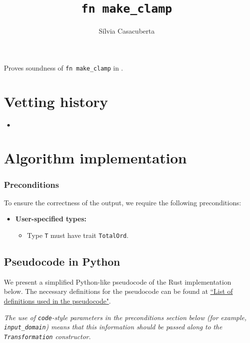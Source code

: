 \documentclass{article}
\title{\texttt{fn make\_clamp}}
\author{S\'ilvia Casacuberta}
\date{}
\begin{document}
\maketitle

\contrib
Proves soundness of \texttt{fn make\_clamp} in .

\section{Vetting history}
\begin{itemize}
    \item {}
\end{itemize}
\section{Algorithm implementation}


\subsubsection*{Preconditions}
To ensure the correctness of the output, we require the following preconditions:

\begin{itemize}
    \item \textbf{User-specified types:}
    \begin{itemize}
        \item Type \texttt{T} must have trait \texttt{TotalOrd}.
    \end{itemize}
\end{itemize}


\subsection{Pseudocode in Python}\label{sec:pseudocode}
We present a simplified Python-like pseudocode of the Rust implementation below. The necessary definitions for the pseudocode can be found at \href{https://www.overleaf.com/project/60d215bf90b337ac02200a99}{``List of definitions used in the pseudocode"}. 

\emph{The use of \texttt{code}-style parameters in the preconditions section below (for example, \texttt{input\_domain}) means that this information should be passed along to the \texttt{Transformation} constructor.}
\end{document}
